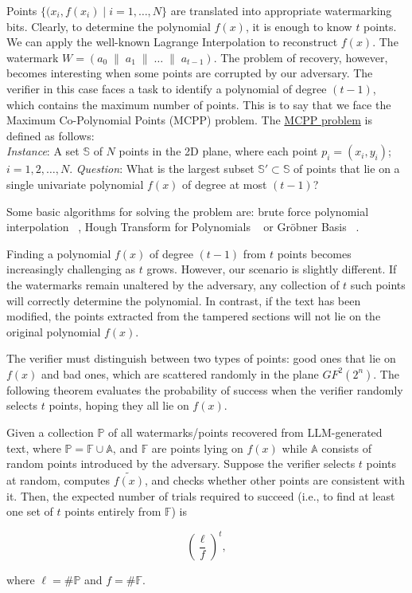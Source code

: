 \documentclass[a4paper,11pt]{llncs}
\begin{document}
Points $\{(x_i,f(x_i)\; | \; i=1,\ldots,N\}$ are translated into appropriate watermarking bits. Clearly, to determine the polynomial $f(x)$, it is enough to know $t$ points. We can apply the well-known Lagrange Interpolation to reconstruct $f(x)$. The watermark $W=(a_0\;\|\;a_1\;\| \; \ldots \;\|\;a_{t-1})$. The problem of recovery, however, becomes interesting when some points are corrupted by our adversary. The verifier in this case faces a task to identify a polynomial of degree $(t-1)$, which contains the maximum number of points. This is to say that we face the Maximum Co-Polynomial Points (MCPP) problem.
\vspace{2mm}
\noindent
The \underline{MCPP problem} is defined as follows:\\
\noindent
{\it Instance}: A set $\mathbb S$ of $N$ points in the 2D plane, where each point
$p_i=(x_i,y_i)$; $i=1,2,\ldots,N$.
\noindent
{\it Question}: What is the largest subset ${\mathbb S}' \subset {\mathbb S}$ of points that
lie on a single univariate polynomial $f(x)$ of degree at most $(t-1)$?
\vspace{1mm}

Some basic algorithms for solving the problem are: brute force polynomial interpolation ~\cite{Berrut2004}, Hough Transform for Polynomials ~\cite{Ballard_1981} or Gr\"{o}bner Basis ~\cite{Sauer_2006}.

Finding a polynomial $f(x)$ of degree $(t-1)$ from $t$ points becomes increasingly challenging as $t$ grows. However, our scenario is slightly different. If the watermarks remain unaltered by the adversary, any collection of $t$ such points will correctly determine the polynomial. In contrast, if the text has been modified, the points extracted from the tampered sections will not lie on the original polynomial $f(x)$.

The verifier must distinguish between two types of points: good ones that lie on $f(x)$ and bad ones, which are scattered randomly in the plane $GF^2(2^n)$. The following theorem evaluates the probability of success when the verifier randomly selects $t$ points, hoping they all lie on $f(x)$.

\begin{theorem}
    Given a collection ${\mathbb P}$ of all watermarks/points recovered from LLM-generated text, where ${\mathbb P} = {\mathbb F} \cup {\mathbb A}$, and ${\mathbb F}$ are points lying on $f(x)$ while ${\mathbb A}$ consists of random points introduced by the adversary. Suppose the verifier selects $t$ points at random, computes $\widetilde{f(x)}$, and checks whether other points are consistent with it. Then, the expected number of trials required to succeed (i.e., to find at least one set of $t$ points entirely from ${\mathbb F}$) is
    
    \[
    	\left(\frac{\ell}{f}\right)^{t},
    \]
    
    where $\ell=\#{\mathbb P}$ and $f=\#{\mathbb F}$.
\end{theorem}
\end{document}

